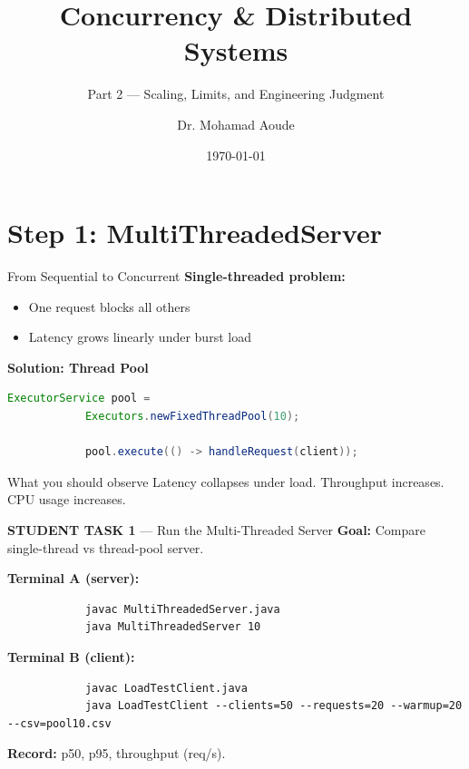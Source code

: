 \documentclass[11pt]{beamer}
\title{Concurrency \& Distributed Systems}
\subtitle{Part 2 --- Scaling, Limits, and Engineering Judgment}
\author{Dr. Mohamad Aoude}
\institute{Lebanese University \\ Faculty of Engineering}
\date{\today}
\begin{document}
	
	\begin{frame}
		\titlepage
	\end{frame}
	
	\section{Step 1: MultiThreadedServer}
	
	\begin{frame}[fragile]{From Sequential to Concurrent}
		\textbf{Single-threaded problem:}
		\begin{itemize}
			\item One request blocks all others
			\item Latency grows linearly under burst load
		\end{itemize}
		

		\textbf{Solution: Thread Pool}
		
		\begin{lstlisting}[language=Java]
			ExecutorService pool =
			Executors.newFixedThreadPool(10);
			
			pool.execute(() -> handleRequest(client));
		\end{lstlisting}
		

		
		\begin{block}{What you should observe}
			Latency collapses under load. Throughput increases. CPU usage increases.
		\end{block}
	\end{frame}
	
	\begin{frame}[fragile]{\textbf{STUDENT TASK 1} --- Run the Multi-Threaded Server}
		\textbf{Goal:} Compare single-thread vs thread-pool server.
		
		\textbf{Terminal A (server):}
		\begin{lstlisting}
			javac MultiThreadedServer.java
			java MultiThreadedServer 10
		\end{lstlisting}
		

		\textbf{Terminal B (client):}
		\begin{lstlisting}
			javac LoadTestClient.java
			java LoadTestClient --clients=50 --requests=20 --warmup=20 --csv=pool10.csv
		\end{lstlisting}

		
		\textbf{Record:} p50, p95, throughput (req/s).
	\end{frame}
	
\end{document}
